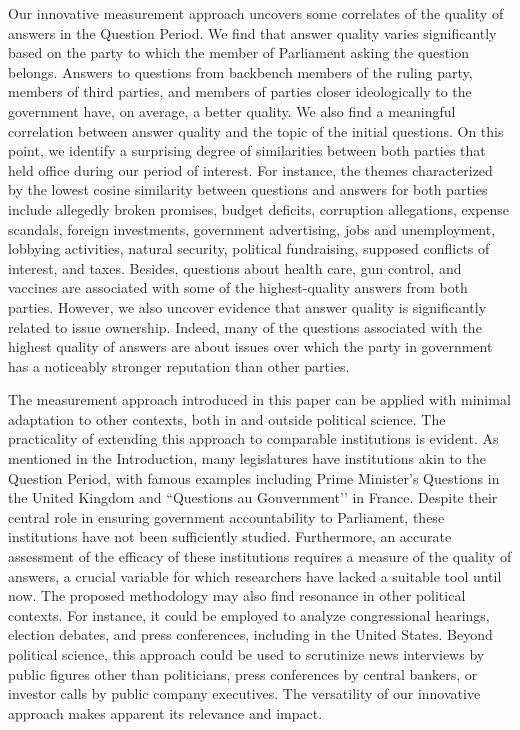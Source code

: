 {{Our innovative measurement approach uncovers some correlates of the quality of answers in the Question Period. We find that answer quality varies significantly based on the party to which the member of Parliament asking the question belongs. Answers to questions from backbench members of the ruling party, members of third parties, and members of parties closer ideologically to the government have, on average, a better quality. We also find a meaningful correlation between answer quality and the topic of the initial questions. On this point, we identify a surprising degree of similarities between both parties that held office during our period of interest. For instance, the themes characterized by the lowest cosine similarity between questions and answers for both parties include allegedly broken promises, budget deficits, corruption allegations, expense scandals, foreign investments, government advertising, jobs and unemployment, lobbying activities, natural security, political fundraising, supposed conflicts of interest, and taxes. Besides, questions about health care, gun control, and vaccines are associated with some of the highest-quality answers from both parties. However, we also uncover evidence that answer quality is significantly related to issue ownership. Indeed, many of the questions associated with the highest quality of answers are about issues over which the party in government has a noticeably stronger reputation than other parties.

The measurement approach introduced in this paper can be applied with minimal adaptation to other contexts, both in and outside political science. The practicality of extending this approach to comparable institutions is evident. As mentioned in the Introduction, many legislatures have institutions akin to the Question Period, with famous examples including Prime Minister’s Questions in the United Kingdom and ``Questions au Gouvernment’’ in France. Despite their central role in ensuring government accountability to Parliament, these institutions have not been sufficiently studied. Furthermore, an accurate assessment of the efficacy of these institutions requires a measure of the quality of answers, a crucial variable for which researchers have lacked a suitable tool until now. The proposed methodology may also find resonance in other political contexts. For instance, it could be employed to analyze congressional hearings, election debates, and press conferences, including in the United States. Beyond political science, this approach could be used to scrutinize news interviews by public figures other than politicians, press conferences by central bankers, or investor calls by public company executives. The versatility of our innovative approach makes apparent its relevance and impact.

}}
